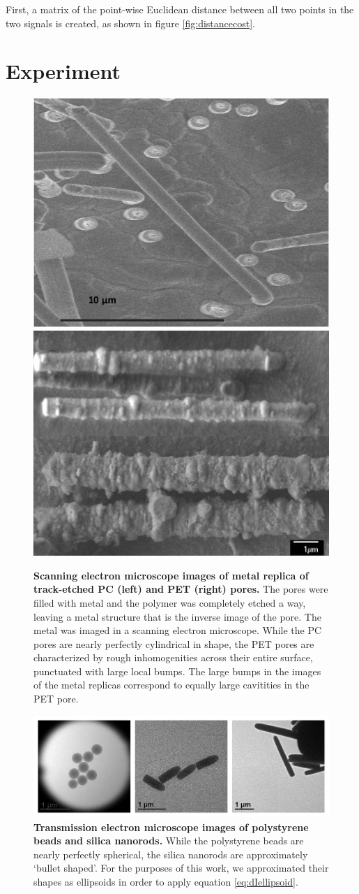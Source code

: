 			
			First, a matrix of the point-wise Euclidean distance between all two points in the two signals is created, as shown in figure \ref{fig:distancecost}. 
		
	\section{Experiment}
	    
		\begin{figure}
			\hfill
			\includegraphics[height=0.35\textwidth]{PC}
			\hfill
			\includegraphics[height=0.35\textwidth]{PET}
			\hfill
			\caption{\textbf{Scanning electron microscope images of metal replica of track-etched PC (left) and PET (right) pores.} The pores were filled with metal and the polymer was completely etched a way, leaving a metal structure that is the inverse image of the pore. The metal was imaged in a scanning electron microscope. While the PC pores are nearly perfectly cylindrical in shape, the PET pores are characterized by rough inhomogenities across their entire surface, punctuated with large local bumps. The large bumps in the images of the metal replicas correspond to equally large cavitities in the PET pore.}
			\label{fig:PCPET}
		\end{figure}
		
		\begin{figure}
			\includegraphics[width=1\textwidth]{particles}
			\caption{\textbf{Transmission electron microscope images of polystyrene beads and silica nanorods.} While the polystyrene beads are nearly perfectly spherical, the silica nanorods are approximately `bullet shaped'. For the purposes of this work, we approximated their shapes as ellipsoids in order to apply equation \ref{eq:dIellipsoid}.}
			\label{fig:particles}
		\end{figure}


